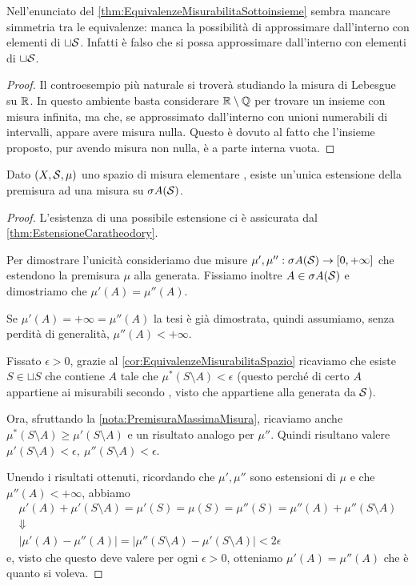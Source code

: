 \begin{remark}
	Nell'enunciato del \cref{thm:EquivalenzeMisurabilitaSottoinsieme} sembra mancare simmetria tra le equivalenze: manca la possibilità di approssimare dall'interno con elementi di $\sqcup\S$. Infatti è falso che si possa approssimare dall'interno con elementi di $\sqcup\S$.
\end{remark}
\begin{proof}
	Il controesempio più naturale si troverà studiando la misura di Lebesgue su $\R$. In questo ambiente basta considerare $\R\setminus\mathbb Q$ per trovare un insieme con misura infinita, ma che, se approssimato dall'interno con unioni numerabili di intervalli, appare avere misura nulla. Questo è dovuto al fatto che l'insieme proposto, pur avendo misura non nulla, è a parte interna vuota.
\end{proof}




\begin{proposition}\label{prop:UnicitaCaratheodory}
	Dato $(X,\S,\mu)$ uno spazio di misura elementare \sigfin[o], esiste un'unica estensione della premisura ad una misura su $\sigma A(\S)$.
\end{proposition}
\begin{proof}
	L'esistenza di una possibile estensione ci è assicurata dal \cref{thm:EstensioneCaratheodory}.
	
	Per dimostrare l'unicità consideriamo due misure $\mu',\mu'':\sigma A(\S)\to\Rpiu$ che estendono la premisura $\mu$ alla \sigalg{} generata. Fissiamo inoltre $A\in\sigma A(\S)$ e dimostriamo che $\mu'(A)=\mu''(A)$.
	
	Se $\mu'(A)=+\infty=\mu''(A)$ la tesi è già dimostrata,  quindi assumiamo, senza perdità di generalità, $\mu''(A)<+\infty$.
	
	Fissato $\epsilon>0$, grazie al \cref{cor:EquivalenzeMisurabilitaSpazio} ricaviamo che esiste $S\in\sqcup S$ che contiene $A$ tale che $\mu^*(S\setminus A)< \epsilon$ (questo perché di certo $A$ appartiene ai misurabili secondo \carat{}, visto che appartiene alla \sigalg{} generata da $\S$).
	
	Ora, sfruttando la \cref{nota:PremisuraMassimaMisura}, ricaviamo anche $\mu^*(S\setminus A)\ge\mu'(S\setminus A)$ e un risultato analogo per $\mu''$. Quindi risultano valere $\mu'(S\setminus A)<\epsilon,\ \mu''(S\setminus A)<\epsilon$.
	
	Unendo i risultati ottenuti, ricordando che $\mu',\mu''$ sono estensioni di $\mu$ e che $\mu''(A)<+\infty$,  abbiamo
	\begin{gather*}
		\mu'(A)+\mu'(S\setminus A)=\mu'(S)=\mu(S)=\mu''(S)=\mu''(A)+\mu''(S\setminus A) \\
		\Downarrow \\
		\lvert\mu'(A)-\mu''(A)\rvert=\lvert\mu''(S\setminus A)-\mu'(S\setminus A)\rvert<2\epsilon
	\end{gather*}
	e, visto che questo deve valere per ogni $\epsilon>0$, otteniamo $\mu'(A)=\mu''(A)$ che è quanto si voleva.
\end{proof}

